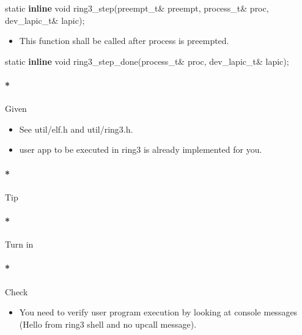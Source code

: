 \documentclass[]{article}
\newenvironment{Shaded}{}{}
\newcommand{\KeywordTok}[1]{\textbf{{#1}}}
\newcommand{\DataTypeTok}[1]{\textcolor[rgb]{0.50,0.00,0.00}{{#1}}}
\newcommand{\NormalTok}[1]{{#1}}
\providecommand{\tightlist}{%
  \setlength{\itemsep}{0pt}\setlength{\parskip}{0pt}}
\let\oldparagraph\paragraph
\renewcommand{\paragraph}[1]{\oldparagraph{#1}\mbox{}}
\begin{document}
\begin{Shaded}
\begin{Highlighting}[]
\DataTypeTok{static} \KeywordTok{inline} \DataTypeTok{void} \NormalTok{ring3_step(preempt_t& preempt, process_t& proc, dev_lapic_t& lapic);}
\end{Highlighting}
\end{Shaded}

\begin{itemize}
\tightlist
\item
  This function shall be called after process is preempted.
\end{itemize}

\begin{Shaded}
\begin{Highlighting}[]
\DataTypeTok{static} \KeywordTok{inline} \DataTypeTok{void} \NormalTok{ring3_step_done(process_t& proc, dev_lapic_t& lapic);}
\end{Highlighting}
\end{Shaded}

\paragraph*{Given}\label{given-9}

\begin{itemize}
\tightlist
\item
  See util/elf.h and util/ring3.h.
\item
  user app to be executed in ring3 is already implemented for you.
\end{itemize}

\paragraph*{Tip}\label{tip-9}

\paragraph*{Turn in}\label{turn-in-9}

\paragraph*{Check}\label{check-9}

\begin{itemize}
\tightlist
\item
  You need to verify user program execution by looking at console
  messages (Hello from ring3 shell and no upcall message).
\end{itemize}
\end{document}

